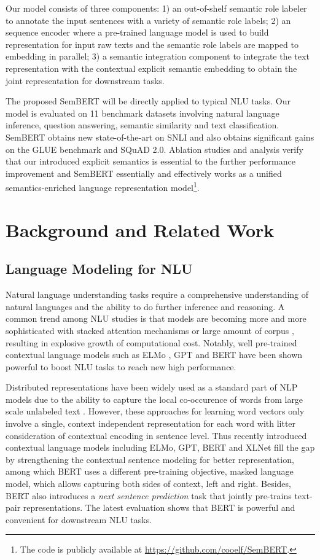 \documentclass[letterpaper]{article} \usepackage{aaai20}  \usepackage{times}  \usepackage{helvet} \usepackage{courier}  \usepackage[hyphens]{url}  \usepackage{graphicx} \urlstyle{rm} \def\UrlFont{\rm}  \usepackage{graphicx}  \frenchspacing  \usepackage{amssymb}
\begin{document}
Our model consists of three components:  1) an out-of-shelf semantic role labeler to annotate the input sentences with a variety of semantic role labels; 2) an sequence encoder where a pre-trained language model is  used  to  build  representation  for input raw texts and the semantic role labels are mapped to embedding in parallel;  3) a semantic integration component to integrate the text representation with the contextual explicit semantic embedding to obtain the joint representation for downstream tasks. 

The proposed SemBERT will be directly applied to typical NLU tasks. Our model is evaluated on 11 benchmark datasets involving natural language inference, question answering, semantic similarity and text classification. SemBERT obtains new state-of-the-art on SNLI and also obtains significant gains on the GLUE benchmark and SQuAD 2.0. Ablation studies and analysis verify that our introduced explicit semantics is essential to the further performance improvement and SemBERT essentially and effectively works as a unified semantics-enriched language representation model\footnote{The code is publicly available at \url{https://github.com/cooelf/SemBERT}.}.

\section{Background and Related Work}\label{sec:related}
\subsection{Language Modeling for NLU}
Natural language understanding tasks require a comprehensive understanding of natural languages and the ability to do further inference and reasoning. A common trend among NLU studies is that models are becoming more and more sophisticated with stacked attention mechanisms or large amount of corpus \cite{zhang2018DUA,zhang2019dual,zhou2019limit}, resulting in explosive growth of computational cost. Notably, well pre-trained contextual language models such as ELMo \cite{Peters2018ELMO}, GPT \cite{radford2018improving} and BERT \cite{devlin2018bert} have been shown powerful to boost NLU tasks to reach new high performance. 

Distributed representations have been widely used as a standard part of NLP models due to the ability to capture the local co-occurence of words from large scale unlabeled text \cite{mikolov2013distributed}. However, these approaches for learning word vectors only involve a single, context independent representation for each word with litter consideration of contextual encoding in sentence level. Thus recently introduced contextual language models including ELMo, GPT, BERT and XLNet fill the gap by strengthening the contextual sentence modeling for better representation, among which BERT uses a different pre-training objective, masked language model, which allows capturing both sides of context, left and right. Besides, BERT also introduces a \emph{next sentence prediction} task that jointly pre-trains text-pair representations. The latest evaluation shows that BERT is powerful and convenient for downstream NLU tasks.
\end{document}
